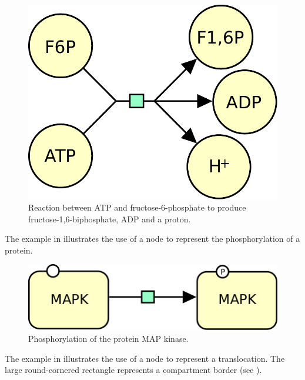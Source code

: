 \begin{figure}[htb]
  \centering
  \includegraphics[scale = 0.5]{le_images/process-reaction}
  \caption{Reaction between ATP and fructose-6-phosphate to produce fructose-1,6-biphosphate, ADP and a proton.}
  \label{fig:trans-react}
\end{figure}

The example in  illustrates the use of a  node to represent the phosphorylation of a protein. 

\begin{figure}[htb]
  \centering
  \includegraphics[scale = 0.5]{le_images/process-phosphorylation}
  \caption{Phosphorylation of the protein MAP kinase.}
  \label{fig:trans-phos}
\end{figure}


The example in  illustrates the use of a  node to represent a translocation. The large round-cornered rectangle represents a compartment border (see ).

